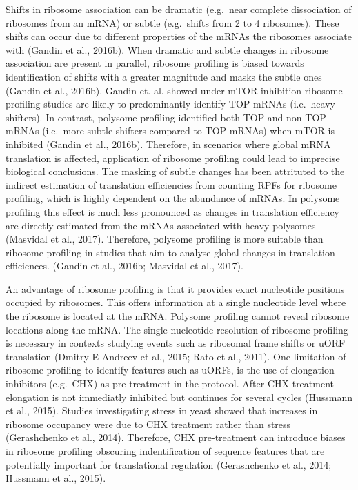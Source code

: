 \documentclass[12pt,openany]{book}
\begin{document}
Shifts in ribosome association can be dramatic (e.g.~near complete
dissociation of ribosomes from an mRNA) or subtle (e.g.~shifts from 2 to
4 ribosomes). These shifts can occur due to different properties of the
mRNAs the ribosomes associate with (Gandin et al., 2016b). When dramatic
and subtle changes in ribosome association are present in parallel,
ribosome profiling is biased towards identification of shifts with a
greater magnitude and masks the subtle ones (Gandin et al., 2016b).
Gandin et. al. showed under mTOR inhibition ribosome profiling studies
are likely to predominantly identify TOP mRNAs (i.e.~heavy shifters). In
contrast, polysome profiling identified both TOP and non-TOP mRNAs
(i.e.~more subtle shifters compared to TOP mRNAs) when mTOR is inhibited
(Gandin et al., 2016b). Therefore, in scenarios where global mRNA
translation is affected, application of ribosome profiling could lead to
imprecise biological conclusions. The masking of subtle changes has been
attrituted to the indirect estimation of translation efficiencies from
counting RPFs for ribosome profiling, which is highly dependent on the
abundance of mRNAs. In polysome profiling this effect is much less
pronounced as changes in translation efficiency are directly estimated
from the mRNAs associated with heavy polysomes (Masvidal et al., 2017).
Therefore, polysome profiling is more suitable than ribosome profiling
in studies that aim to analyse global changes in translation
efficiences. (Gandin et al., 2016b; Masvidal et al., 2017).

An advantage of ribosome profiling is that it provides exact nucleotide
positions occupied by ribosomes. This offers information at a single
nucleotide level where the ribosome is located at the mRNA. Polysome
profiling cannot reveal ribosome locations along the mRNA. The single
nucleotide resolution of ribosome profiling is necessary in contexts
studying events such as ribosomal frame shifts or uORF translation
(Dmitry E Andreev et al., 2015; Rato et al., 2011). One limitation of
ribosome profiling to identify features such as uORFs, is the use of
elongation inhibitors (e.g.~CHX) as pre-treatment in the protocol. After
CHX treatment elongation is not immediatly inhibited but continues for
several cycles (Hussmann et al., 2015). Studies investigating stress in
yeast showed that increases in ribosome occupancy were due to CHX
treatment rather than stress (Gerashchenko et al., 2014). Therefore, CHX
pre-treatment can introduce biases in ribosome profiling obscuring
indentification of sequence features that are potentially important for
translational regulation (Gerashchenko et al., 2014; Hussmann et al.,
2015).
\end{document}
